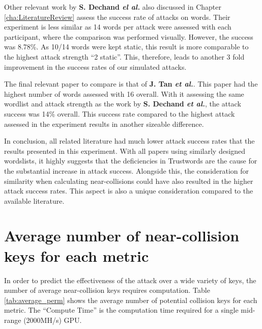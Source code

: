 Other relevant work by \textbf{S. Dechand \textit{el al.}}\cite{dechand2016empirical} also discussed in Chapter \ref{cha:LiteratureReview} assess the success rate of attacks on words. Their experiment is less similar as 14 words per attack were assessed with each participant, where the comparison was performed visually. However, the success was 8.78\%. As 10/14 words were kept static, this result is more comparable to the highest attack strength ``2 static''. This, therefore, leads to another 3 fold improvement in the success rates of our simulated attacks. 

The final relevant paper to compare is that of \textbf{J. Tan \textit{et al.}}\cite{tan2017can}. This paper had the highest number of words assessed with 16 overall. With it assessing the same wordlist and attack strength as the work by \textbf{S. Dechand \textit{et al.}}\cite{dechand2016empirical}, the attack success was 14\% overall. This success rate compared to the highest attack assessed in the experiment results in another sizeable difference.

In conclusion, all related literature had much lower attack success rates that the results presented in this experiment. With all papers using similarly designed wordslists, it highly suggests that the deficiencies in Trustwords are the cause for the substantial increase in attack success. Alongside this, the consideration for similarity when calculating near-collisions could have also resulted in the higher attack success rates. This aspect is also a unique consideration compared to the available literature.

\section{Average number of near-collision keys for each metric}
\label{sec:averagePerms}
In order to predict the effectiveness of the attack over a wide variety of keys, the number of average near-collision keys requires computation. Table \ref{tab:average_perm} shows the average number of potential collision keys for each metric. The ``Compute Time'' is the computation time required for a single mid-range (2000MH/s) GPU.

